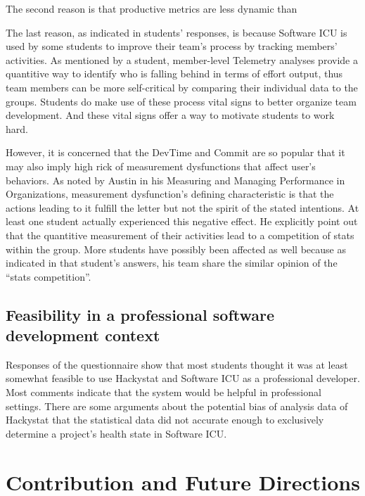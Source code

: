 The second reason is that productive metrics are less dynamic than 

The last reason, as indicated in students' responses, is because Software ICU is used by some students to improve their team's process by tracking members' activities. As mentioned by a student, member-level Telemetry analyses provide a quantitive way to identify who is falling behind in terms of effort output, thus team members can be more self-critical by comparing their individual data to the groups. Students do make use of these process vital signs to better organize team development. And these vital signs offer a way to motivate students to work hard.

However, it is concerned that the DevTime and Commit are so popular that it may also imply high rick of measurement dysfunctions that affect user's behaviors. As noted by Austin in his Measuring and Managing Performance in Organizations\cite{Austin96}, measurement dysfunction’s defining characteristic is that the actions leading to it fulfill the letter but not the spirit of the stated intentions. At least one student actually experienced this negative effect. He explicitly point out that the quantitive measurement of their activities lead to a competition of stats within the group. More students have possibly been affected as well because as indicated in that student's answers, his team share the similar opinion of the ``stats competition''.

\section {Feasibility in a professional software development context}
Responses of the questionnaire show that most students thought it was at least somewhat feasible to use Hackystat and Software ICU as a professional developer. Most comments indicate that the system would be helpful in professional settings. There are some arguments about the potential bias of analysis data of Hackystat that the statistical data did not accurate enough to exclusively determine a project's health state in Software ICU.

\chapter{Contribution and Future Directions}




